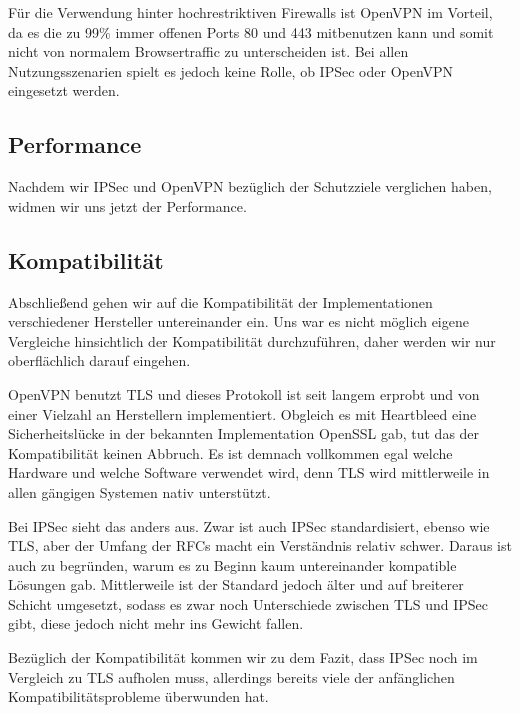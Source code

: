 \documentclass[12pt]{scrartcl}
\begin{document}
Für die Verwendung hinter hochrestriktiven Firewalls ist OpenVPN im Vorteil, da es die zu 99\% immer offenen Ports 80 und 443 mitbenutzen kann und somit nicht von normalem Browsertraffic zu unterscheiden ist. Bei allen Nutzungsszenarien spielt es jedoch keine Rolle, ob IPSec oder OpenVPN eingesetzt werden.

\subsection{Performance}
Nachdem wir IPSec und OpenVPN bezüglich der Schutzziele verglichen haben, widmen wir uns jetzt der Performance.


\subsection{Kompatibilität}
Abschließend gehen wir auf die Kompatibilität der Implementationen verschiedener Hersteller untereinander ein. Uns war es nicht möglich eigene Vergleiche hinsichtlich der Kompatibilität durchzuführen, daher werden wir nur oberflächlich darauf eingehen.

OpenVPN benutzt TLS und dieses Protokoll ist seit langem erprobt und von einer Vielzahl an Herstellern implementiert. Obgleich es mit Heartbleed eine Sicherheitslücke in der bekannten Implementation OpenSSL gab, tut das der Kompatibilität keinen Abbruch. Es ist demnach vollkommen egal welche Hardware und welche Software verwendet wird, denn TLS wird mittlerweile in allen gängigen Systemen nativ unterstützt.

Bei IPSec sieht das anders aus. Zwar ist auch IPSec standardisiert, ebenso wie TLS, aber der Umfang der RFCs macht ein Verständnis relativ schwer. Daraus ist auch zu begründen, warum es zu Beginn kaum untereinander kompatible Lösungen gab\cite{Alshamsi2005}. Mittlerweile ist der Standard jedoch älter und auf breiterer Schicht umgesetzt, sodass es zwar noch Unterschiede zwischen TLS und IPSec gibt, diese jedoch nicht mehr ins Gewicht fallen.

Bezüglich der Kompatibilität kommen wir zu dem Fazit, dass IPSec noch im Vergleich zu TLS aufholen muss, allerdings bereits viele der anfänglichen Kompatibilitätsprobleme überwunden hat.

\clearpage
\end{document}
